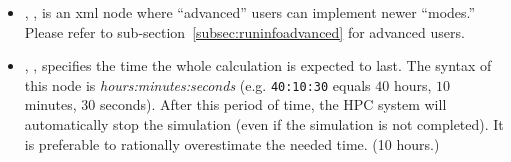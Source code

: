 \begin{itemize}

\item {}, , is an
xml node where ``advanced'' users can implement newer ``modes.''
%
Please refer to sub-section~\ref{subsec:runinfoadvanced} for advanced users.

%

\item {}, , specifies the time the whole calculation is expected to
last.
%
The syntax of this node is \textit{hours:minutes:seconds} (e.g.
\texttt{40:10:30} equals $40$ hours, $10$ minutes, $30$ seconds). After this
period of time, the HPC system will automatically stop the simulation (even if
the simulation is not completed). It is preferable to rationally overestimate
the needed time.
%
 (10 hours.)
\end{itemize}

